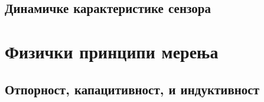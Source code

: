 \setcounter{fid}{0}
\graphicspath{{./1_uvod/1_stat/}}
\noindent

\vspace*{\ProblemSep}
\goodbreak


\setcounter{fid}{0}
\graphicspath{{./1_uvod/1_stat/}}
\noindent

\vspace*{\ProblemSep}
\goodbreak


\setcounter{fid}{0}
\graphicspath{{./1_uvod/1_stat/}}
\noindent

\vspace*{\ProblemSep}
\goodbreak
\subsection{Динамичке карактеристике сензора}


\setcounter{fid}{0}
\graphicspath{{./1_uvod/2_din/}}
\noindent

\vspace*{\ProblemSep}
\goodbreak


\setcounter{fid}{0}
\graphicspath{{./1_uvod/2_din/}}
\noindent

\vspace*{\ProblemSep}
\goodbreak


\setcounter{fid}{0}
\graphicspath{{./1_uvod/2_din/}}
\noindent

\vspace*{\ProblemSep}
\goodbreak
\section{Физички принципи мерења }
\subsection{Отпорност, капацитивност, и индуктивност}


\setcounter{fid}{0}
\graphicspath{{./2_principi/1_rlc/}}
\noindent

\vspace*{\ProblemSep}
\goodbreak


\setcounter{fid}{0}
\graphicspath{{./2_principi/1_rlc/}}
\noindent

\vspace*{\ProblemSep}
\goodbreak


\setcounter{fid}{0}
\graphicspath{{./2_principi/1_rlc/}}
\noindent

\vspace*{\ProblemSep}
\goodbreak
